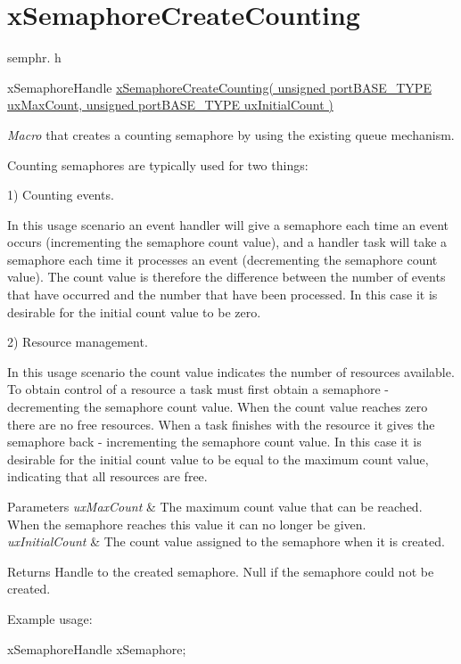 \hypertarget{group__xSemaphoreCreateCounting}{}\section{x\+Semaphore\+Create\+Counting}
\label{group__xSemaphoreCreateCounting}
semphr. h 
\begin{DoxyPre}xSemaphoreHandle \hyperlink{semphr_8h_a7764616a918a46115403569a88148ad4}{xSemaphoreCreateCounting( unsigned portBASE\_TYPE uxMaxCount, unsigned portBASE\_TYPE uxInitialCount )}\end{DoxyPre}


{\itshape Macro} that creates a counting semaphore by using the existing queue mechanism.

Counting semaphores are typically used for two things\+:

1) Counting events.

In this usage scenario an event handler will \textquotesingle{}give\textquotesingle{} a semaphore each time an event occurs (incrementing the semaphore count value), and a handler task will \textquotesingle{}take\textquotesingle{} a semaphore each time it processes an event (decrementing the semaphore count value). The count value is therefore the difference between the number of events that have occurred and the number that have been processed. In this case it is desirable for the initial count value to be zero.

2) Resource management.

In this usage scenario the count value indicates the number of resources available. To obtain control of a resource a task must first obtain a semaphore -\/ decrementing the semaphore count value. When the count value reaches zero there are no free resources. When a task finishes with the resource it \textquotesingle{}gives\textquotesingle{} the semaphore back -\/ incrementing the semaphore count value. In this case it is desirable for the initial count value to be equal to the maximum count value, indicating that all resources are free.


\begin{DoxyParams}{Parameters}
{\em ux\+Max\+Count} & The maximum count value that can be reached. When the semaphore reaches this value it can no longer be \textquotesingle{}given\textquotesingle{}.\\
\hline
{\em ux\+Initial\+Count} & The count value assigned to the semaphore when it is created.\\
\hline
\end{DoxyParams}
\begin{DoxyReturn}{Returns}
Handle to the created semaphore. Null if the semaphore could not be created.
\end{DoxyReturn}
Example usage\+: 
\begin{DoxyPre}
xSemaphoreHandle xSemaphore;\end{DoxyPre}



